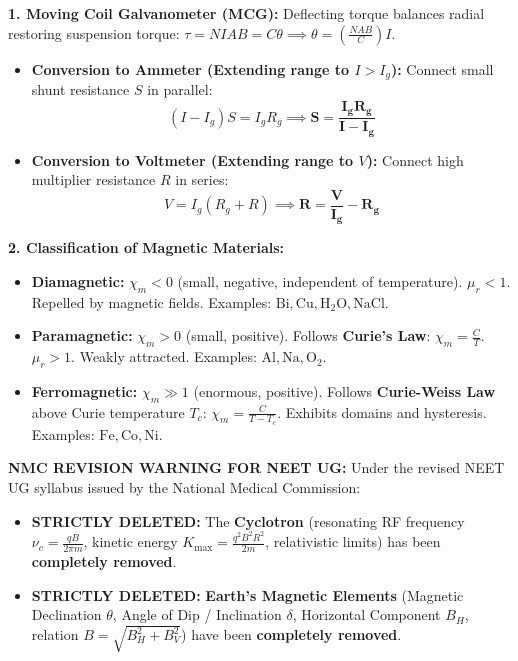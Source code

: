 \documentclass[10pt,twoside,openright]{book}
\begin{document}
\begin{formulabox}
\textbf{1. Moving Coil Galvanometer (MCG):}
Deflecting torque balances radial restoring suspension torque: $\tau = N I A B = C \theta \implies \theta = \left(\frac{NAB}{C}\right)I$.
\begin{itemize}
  \item \textbf{Conversion to Ammeter (Extending range to $I > I_g$):} Connect small shunt resistance $S$ in parallel:
  \begin{equation}
    (I - I_g) S = I_g R_g \implies \mathbf{S = \frac{I_g R_g}{I - I_g}}
  \end{equation}
  \item \textbf{Conversion to Voltmeter (Extending range to $V$):} Connect high multiplier resistance $R$ in series:
  \begin{equation}
    V = I_g (R_g + R) \implies \mathbf{R = \frac{V}{I_g} - R_g}
  \end{equation}
\end{itemize}
\textbf{2. Classification of Magnetic Materials:}
\begin{itemize}
  \item \textbf{Diamagnetic:} $\chi_m < 0$ (small, negative, independent of temperature). $\mu_r < 1$. Repelled by magnetic fields. Examples: $\mathrm{Bi, Cu, H_2O, NaCl}$.
  \item \textbf{Paramagnetic:} $\chi_m > 0$ (small, positive). Follows \textbf{Curie's Law}: $\chi_m = \frac{C}{T}$. $\mu_r > 1$. Weakly attracted. Examples: $\mathrm{Al, Na, O_2}$.
  \item \textbf{Ferromagnetic:} $\chi_m \gg 1$ (enormous, positive). Follows \textbf{Curie-Weiss Law} above Curie temperature $T_c$: $\chi_m = \frac{C}{T - T_c}$. Exhibits domains and hysteresis. Examples: $\mathrm{Fe, Co, Ni}$.
\end{itemize}
\end{formulabox}

\begin{trapbox}
\textbf{NMC REVISION WARNING FOR NEET UG:}
Under the revised NEET UG syllabus issued by the National Medical Commission:
\begin{itemize}
  \item \textbf{STRICTLY DELETED:} The \textbf{Cyclotron} (resonating RF frequency $\nu_c = \frac{qB}{2\pi m}$, kinetic energy $K_{\max} = \frac{q^2 B^2 R^2}{2m}$, relativistic limits) has been \textbf{completely removed}.
  \item \textbf{STRICTLY DELETED:} \textbf{Earth's Magnetic Elements} (Magnetic Declination $\theta$, Angle of Dip / Inclination $\delta$, Horizontal Component $B_H$, relation $B = \sqrt{B_H^2 + B_V^2}$) have been \textbf{completely removed}.
\end{itemize}
\end{trapbox}
\end{document}

